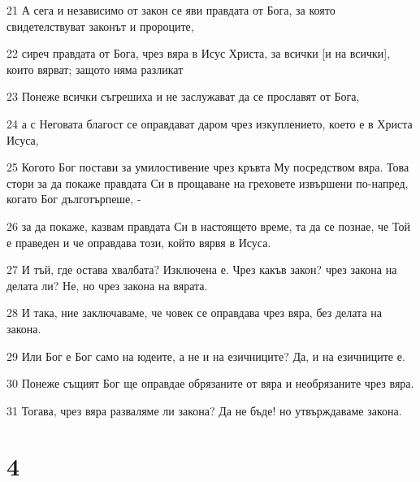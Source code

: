 \par 21 А сега и независимо от закон се яви правдата от Бога, за която свидетелствуват законът и пророците,
\par 22 сиреч правдата от Бога, чрез вяра в Исус Христа, за всички [и на всички], които вярват; защото няма разликат
\par 23 Понеже всички съгрешиха и не заслужават да се прославят от Бога,
\par 24 а с Неговата благост се оправдават даром чрез изкуплението, което е в Христа Исуса,
\par 25 Когото Бог постави за умилостивение чрез кръвта Му посредством вяра. Това стори за да покаже правдата Си в прощаване на греховете извършени по-напред, когато Бог дълготърпеше, -
\par 26 за да покаже, казвам правдата Си в настоящето време, та да се познае, че Той е праведен и че оправдава този, който вярвя в Исуса.
\par 27 И тъй, где остава хвалбата? Изключена е. Чрез какъв закон? чрез закона на делата ли? Не, но чрез закона на вярата.
\par 28 И така, ние заключаваме, че човек се оправдава чрез вяра, без делата на закона.
\par 29 Или Бог е Бог само на юдеите, а не и на езичниците? Да, и на езичниците е.
\par 30 Понеже същият Бог ще оправдае обрязаните от вяра и необрязаните чрез вяра.
\par 31 Тогава, чрез вяра разваляме ли закона? Да не бъде! но утвърждаваме закона.

\chapter{4}


